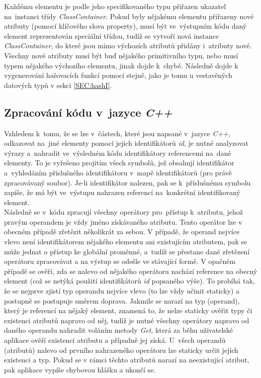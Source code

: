 \documentclass[11pt,twoside,a4paper]{book}
\begin{document}
Každému elementu je podle jeho specifikovaného typu přiřazen ukazatel na~instanci třídy \textit{ClassContainer}. Pokud byly nějakému elementu přiřazeny nové atributy (pomocí klíčového slova property), musí být ve~výstupním kódu daný element reprezentován speciální třídou, tudíž se vytvoří nová instance \textit{ClassContainer}, do které jsou mimo výchozích atributů přidány i~atributy nové. Všechny nové atributy musí být buď nějakého primitivního typu, nebo musí typem nějakého výchozího elementu, jinak dojde k~chybě. Následně dojde k vygenerování hašovacích funkcí pomocí stejně, jako je tomu u vestavěných datových typů v sekci \ref{SEC:hashI}.

\subsection{Zpracování kódu v~jazyce \textit{C++}}
Vzhledem k~tomu, že se lze v~částech, které jsou napsané v~jazyce \textit{C++}, odkazovat na~jiné elementy pomocí jejich identifikátorů \textit{id}, je nutné analyzovat výrazy a~nahradit ve~výsledném kódu identifikátory referencemi na~dané elementy. To je vyřešeno projitím všech symbolů, jež obsahují identifikátor a~vyhledáním příslušného identifikátoru v~mapě identifikátorů (pro právě zpracovávaný soubor). Je-li identifikátor nalezen, pak se k~příslušnému symbolu zapíše, že má být ve~výstupu nahrazen referencí na~konkrétní identifikovaný element.\\
Následně se v~kódu zpracují všechny operátory  pro~přístup k~atributu, jehož pravým operandem je vždy jméno získávaného atributu. Tento operátor lze v obecném případě zřetězit několikrát za sebou. V případě, že operand nejvíce vlevo není identifikátorem nějakého elementu ani existujícím atributem, pak se může jednat o přístup ke globální proměnné, a~tudíž se přestane dané zřetězení operátoru  zpracovávat a na výstup se odešle ve stávající formě. V opačném případě se ověří, zda se nalevo od nějakého operátoru  nachází reference na obecný element (což se netýká použití identifikátorů \textit{id} popsaného výše). To probíhá tak, že se nejprve zjistí typ operandu nejvíce vlevo (to lze vždy učinit staticky) a postupně se postupuje směrem doprava. Jakmile se narazí na typ (operand), který je referencí na nějaký element, znamená to, že nelze staticky ověřit typy či existenci atributů napravo od něj, tudíž je nutné všechny operátory  napravo od daného operandu nahradit voláním metody \textit{Get}, která za běhu uživatelské aplikace ověří existenci atributu a případně jej získá. U~všech operandů (atributů) nalevo od prvního nahrazeného operátoru lze staticky určit jejich existenci a typ. Pokud se v rámci těchto atributů narazí na neexistující atribut, pak aplikace vypíše chybovou hlášku a ukončí se.%
\end{document}

